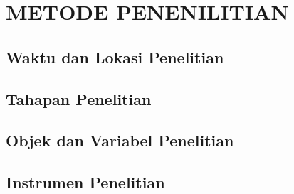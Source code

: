 
\chapter{METODE PENENILITIAN}

\section{Waktu dan Lokasi Penelitian}
\blindtext


\section{Tahapan Penelitian}
\blindtext

\section{Objek dan Variabel Penelitian}
\blindtext

\section{Instrumen Penelitian}
\blindtext

\blindtext

\blindtext
